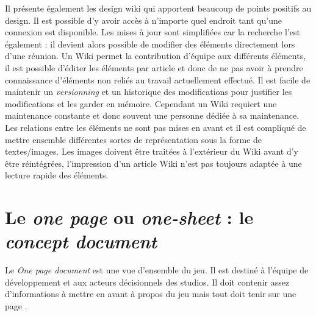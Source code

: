 Il présente également les \guillemotleft design wiki \guillemotright qui apportent beaucoup de points positifs au design. Il est possible d'y avoir accès à n'importe quel endroit tant qu'une connexion est disponible. Les mises à jour sont simplifiées car la recherche l'est également : il devient alors possible de modifier des éléments directement lors d'une réunion. Un Wiki permet la contribution d'équipe aux différents éléments, il est possible d'éditer les éléments par article et donc de ne pas avoir à prendre connaissance d'éléments non reliés au travail actuellement effectué. Il est facile de maintenir un \emph{versionning} et un historique des modifications pour justifier les modifications et les garder en mémoire. Cependant un Wiki requiert une maintenance constante et donc souvent une personne dédiée à sa maintenance. Les relations entre les éléments ne sont pas mises en avant et il est compliqué de mettre ensemble différentes sortes de représentation sous la forme de textes/images. Les images doivent être traitées à l'extérieur du Wiki avant d'y être réintégrées, l'impression d'un article Wiki n'est pas toujours adaptée à une lecture rapide des éléments.\\



\section{Le \emph{\guillemotleft one page \guillemotright} ou \emph{\guillemotleft one-sheet \guillemotright} : le \emph{concept document}}
Le \emph{One page document} est une vue d'ensemble du jeu. Il est destiné à l'équipe de développement et aux acteurs décisionnels des studios. Il doit contenir assez d'informations à mettre en avant à propos du jeu mais tout doit tenir sur une page \cite{LevelUpRogers2014}.

